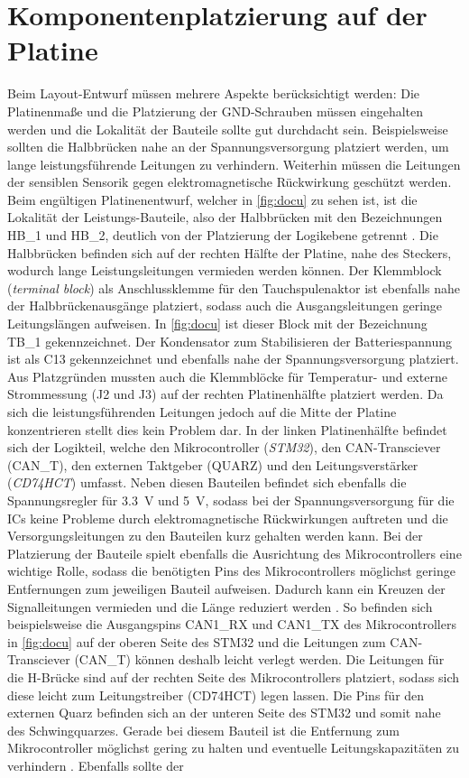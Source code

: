 \section{Komponentenplatzierung auf der Platine}\label{sec:bau}
Beim Layout-Entwurf müssen mehrere Aspekte berücksichtigt werden: Die Platinenmaße und die Platzierung der GND-Schrauben müssen eingehalten werden und die Lokalität der Bauteile sollte gut durchdacht sein. Beispielsweise sollten die Halbbrücken nahe an der Spannungsversorgung platziert werden, um lange leistungsführende Leitungen zu verhindern. Weiterhin müssen die Leitungen der sensiblen Sensorik gegen elektromagnetische Rückwirkung geschützt werden. Beim engültigen Platinenentwurf, welcher in \autoref{fig:docu} zu sehen ist, ist die Lokalität der Leistungs-Bauteile, also der Halbbrücken mit den Bezeichnungen HB\_1 und HB\_2, deutlich von der Platzierung der Logikebene getrennt \cite[S.26]{emcdes}. Die Halbbrücken befinden sich auf der rechten Hälfte der Platine, nahe des Steckers, wodurch lange Leistungsleitungen vermieden werden können. Der Klemmblock (\textit{terminal block}) als Anschlussklemme für den Tauchspulenaktor ist ebenfalls nahe der Halbbrückenausgänge platziert, sodass auch die Ausgangsleitungen geringe Leitungslängen aufweisen. In \autoref{fig:docu} ist dieser Block mit der Bezeichnung TB\_1 gekennzeichnet. Der Kondensator zum Stabilisieren der Batteriespannung ist als C13 gekennzeichnet und ebenfalls nahe der Spannungsversorgung platziert. Aus Platzgründen mussten auch die Klemmblöcke für Temperatur- und externe Strommessung (J2 und J3) auf der rechten Platinenhälfte platziert werden. Da sich die leistungsführenden Leitungen jedoch auf die Mitte der Platine konzentrieren stellt dies kein Problem dar. In der linken Platinenhälfte befindet sich der Logikteil, welche den Mikrocontroller (\textit{STM32}), den CAN-Transciever (CAN\_T), den externen Taktgeber (QUARZ) und den Leitungsverstärker (\textit{CD74HCT}) umfasst. Neben diesen Bauteilen befindet sich ebenfalls die Spannungsregler für \SI{3,3}{V} und \SI{5}{V}, sodass bei der Spannungsversorgung für die ICs keine Probleme durch elektromagnetische Rückwirkungen auftreten und die Versorgungsleitungen zu den Bauteilen kurz gehalten werden kann. Bei der Platzierung der Bauteile spielt ebenfalls die Ausrichtung des Mikrocontrollers eine wichtige Rolle, sodass die benötigten Pins des Mikrocontrollers möglichst geringe Entfernungen zum jeweiligen Bauteil aufweisen. Dadurch kann ein Kreuzen der Signalleitungen vermieden und die Länge reduziert werden \cite[S.17]{emcdes}. So befinden sich beispielsweise die Ausgangspins CAN1\_RX und CAN1\_TX des Mikrocontrollers in \autoref{fig:docu} auf der oberen Seite des STM32 und die Leitungen zum CAN-Transciever (CAN\_T) können deshalb leicht verlegt werden. Die Leitungen für die H-Brücke sind auf der rechten Seite des Mikrocontrollers platziert, sodass sich diese leicht zum Leitungstreiber (CD74HCT) legen lassen. Die Pins für den externen Quarz befinden sich an der unteren Seite des STM32 und somit nahe des Schwingquarzes. Gerade bei diesem Bauteil ist die Entfernung zum Mikrocontroller möglichst gering zu halten und eventuelle Leitungskapazitäten zu verhindern \cite[S.31]{stmquarz}. Ebenfalls sollte der 